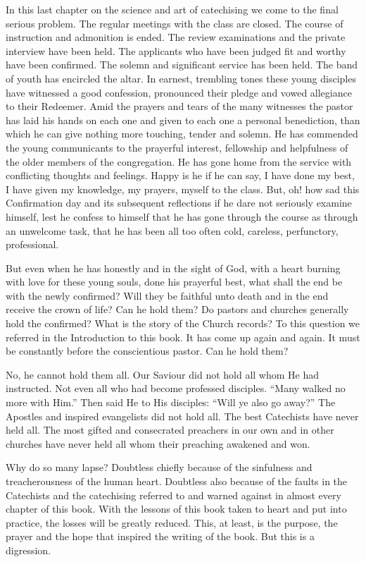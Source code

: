 In this last chapter on the science and art of catechising we come to the final serious problem.  The regular meetings with the class are closed. The course of instruction and admonition is ended. The review examinations and the private interview have been held. The applicants who have been judged fit and worthy have been confirmed. The solemn and significant service has been held. The band of youth has encircled the altar. In earnest, trembling tones these young disciples have witnessed a good confession, pronounced their pledge and vowed allegiance to their Redeemer. Amid the prayers and tears of the many witnesses the pastor has laid his hands on each one and given to each one a personal benediction, than which he can give nothing more touching, tender and solemn. He has commended the young communicants to the prayerful interest, fellowship and helpfulness of the older members of the congregation. He has gone home from the service with conflicting thoughts and feelings. Happy is he if he can say, I have done my best, I have given my knowledge,
my prayers, myself to the class. But, oh! how sad this Confirmation day and its subsequent reflections if he dare not seriously examine himself, lest he confess to himself that he has gone through the course as through an unwelcome task, that he has been all too often cold, careless, perfunctory, professional. 

But even when he has honestly and in the sight of God, with a heart burning with love for these young souls, done his prayerful best, what shall the end be with the newly confirmed?  Will they be faithful unto death and in the end receive the crown of life? Can he hold them? Do pastors and churches generally hold the confirmed? What is the story of the Church records? To this question we referred in the Introduction to this book. It has come up again and again. It must be constantly before the conscientious pastor. Can he hold them? 

No, he cannot hold them all. Our Saviour did not hold all whom He had instructed. Not even all who had become professed disciples. “Many walked no more with Him.” Then said He to His disciples: “Will ye also go away?” The Apostles and inspired evangelists did not hold all. The best Catechists have never held all. The most gifted and consecrated preachers in our own and in other churches have never held all whom their preaching awakened and won.

 Why do so many lapse? Doubtless chiefly because of the sinfulness and treacherousness of the human heart. Doubtless also because of the faults in the Catechists and the catechising referred to and warned against in almost every chapter of this book. With the lessons of this book taken to heart and put into practice, the losses will be greatly reduced. This, at least, is the purpose, the prayer and the hope that inspired the writing of the book. But this is a digression. 

